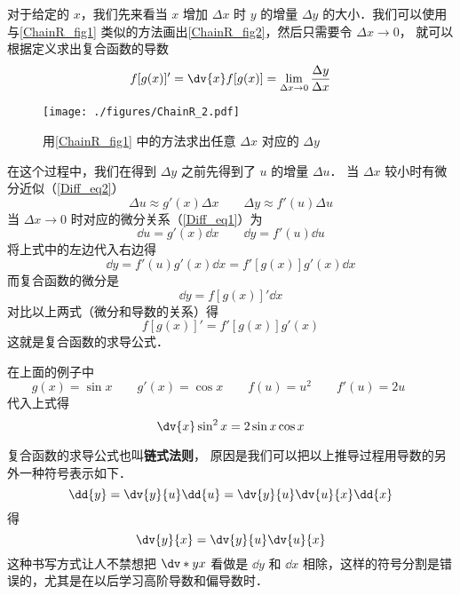 对于给定的 $x$，我们先来看当 $x$ 增加 $\Delta x$ 时 $y$ 的增量 $\Delta y$ 的大小．我们可以使用与\autoref{ChainR_fig1} 类似的方法画出\autoref{ChainR_fig2}，然后只需要令 $\Delta x \to 0$， 就可以根据定义求出复合函数的导数
\begin{equation}
f[g(x)]' = \dv{x} f[g(x)] = \lim_{\Delta x\to 0} \frac{\Delta y}{\Delta x}
\end{equation}

\begin{figure}[ht]
\centering
\texttt{[image: ./figures/ChainR\_2.pdf]}
\caption{用\autoref{ChainR_fig1} 中的方法求出任意 $\Delta x$ 对应的 $\Delta y$} \label{ChainR_fig2}
\end{figure}

在这个过程中，我们在得到 $\Delta y$ 之前先得到了 $u$ 的增量 $\Delta u$． 当 $\Delta x$ 较小时有微分近似（\autoref{Diff_eq2}）
\begin{equation}
\Delta {u} \approx g'(x) \Delta{x}
\qquad
\Delta{y} \approx f'(u) \Delta{u}
\end{equation}
当 $\Delta x \to 0$ 时对应的微分关系（\autoref{Diff_eq1}）为
\begin{equation}
\dd{u} = g'(x) \dd{x}
\qquad
\dd{y} = f'(u) \dd{u}
\end{equation}
将上式中的左边代入右边得
\begin{equation}
\dd{y} = f'(u) g'(x) \dd{x} = f'[g(x)]g'(x) \dd{x}
\end{equation}
而复合函数的微分是
\begin{equation}
\dd{y} = f[g(x)]' \dd{x}
\end{equation}
对比以上两式（微分和导数的关系）得
\begin{equation}\label{ChainR_eq4}
f[g(x)]' = f'[g(x)]g'(x)
\end{equation}
这就是复合函数的求导公式．

在上面的例子中 
\begin{equation}
g(x) = \sin x \qquad
g'(x) = \cos x \qquad %
f(u) = u^2 \qquad
f'(u) = 2u \qquad
\end{equation}
代入上式得
\begin{equation}
\dv{x} \sin^2 x = 2\sin x \cos x
\end{equation}

复合函数的求导公式也叫\textbf{链式法则}， 原因是我们可以把以上推导过程用导数的另外一种符号表示如下．
\begin{equation}
\dd{y} = \dv{y}{u} \dd{u} = \dv{y}{u} \dv{u}{x} \dd{x}
\end{equation}
得
\begin{equation}
\dv{y}{x} = \dv{y}{u} \dv{u}{x}
\end{equation}
这种书写方式让人不禁想把 $\dv*{y}{x}$ 看做是 $\dd{y}$ 和 $\dd{x}$ 相除，这样的符号分割是错误的，尤其是在以后学习高阶导数和偏导数时．%

